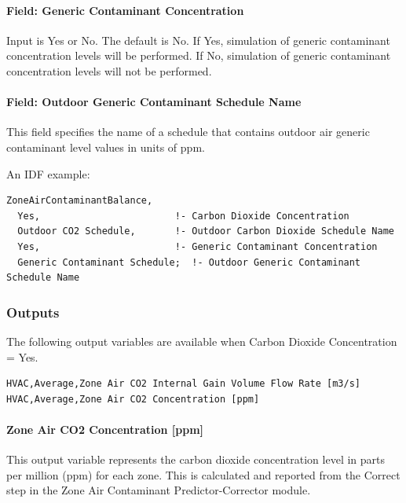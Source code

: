 \paragraph{Field: Generic Contaminant Concentration}\label{field-generic-contaminant-concentration}

Input is Yes or No. The default is No. If Yes, simulation of generic contaminant concentration levels will be performed. If No, simulation of generic contaminant concentration levels will not be performed.

\paragraph{Field: Outdoor Generic Contaminant Schedule Name}\label{field-outdoor-generic-contaminant-schedule-name}

This field specifies the name of a schedule that contains outdoor air generic contaminant level values in units of ppm.

An IDF example:

\begin{lstlisting}
ZoneAirContaminantBalance,
  Yes,                        !- Carbon Dioxide Concentration
  Outdoor CO2 Schedule,       !- Outdoor Carbon Dioxide Schedule Name
  Yes,                        !- Generic Contaminant Concentration
  Generic Contaminant Schedule;  !- Outdoor Generic Contaminant Schedule Name
\end{lstlisting}

\subsubsection{Outputs}\label{outputs-033}

The following output variables are available when Carbon Dioxide Concentration = Yes.

\begin{lstlisting}
HVAC,Average,Zone Air CO2 Internal Gain Volume Flow Rate [m3/s]
HVAC,Average,Zone Air CO2 Concentration [ppm]
\end{lstlisting}

\paragraph{Zone Air CO2 Concentration {[}ppm{]}}\label{zone-air-co2-concentration-ppm}

This output variable represents the carbon dioxide concentration level in parts per million (ppm) for each zone. This is calculated and reported from the Correct step in the Zone Air Contaminant Predictor-Corrector module.

